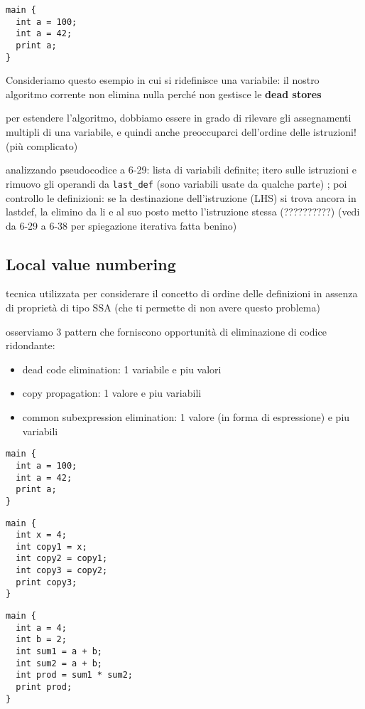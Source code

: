 \begin{lstlisting}
main {
  int a = 100;
  int a = 42;
  print a;
}\end{lstlisting}

Consideriamo questo esempio in cui si ridefinisce una variabile: il nostro algoritmo corrente non elimina nulla perch\'e non gestisce le \textbf{dead stores}

per estendere l'algoritmo, dobbiamo essere in grado di rilevare gli assegnamenti multipli di una variabile, e quindi anche preoccuparci dell'ordine delle istruzioni! (pi\`u complicato)

analizzando pseudocodice a 6-29: lista di variabili definite; itero sulle istruzioni e rimuovo gli operandi da \lstinline|last_def| (sono variabili usate da qualche parte) ; poi controllo le definizioni: se la destinazione dell'istruzione (LHS) si trova ancora in lastdef, la elimino da li e al suo posto metto l'istruzione stessa (??????????) (vedi da 6-29 a 6-38 per spiegazione iterativa fatta benino)

\subsection{Local value numbering}

tecnica utilizzata per considerare il concetto di ordine delle definizioni in assenza di propriet\`a di tipo SSA (che ti permette di non avere questo problema)

osserviamo 3 pattern che forniscono opportunit\`a di eliminazione di codice ridondante:
\begin{itemize}
  \item dead code elimination: 1 variabile e piu valori
  \item copy propagation: 1 valore e piu variabili
  \item common subexpression elimination: 1 valore (in forma di espressione) e piu variabili
\end{itemize}

\begin{lstlisting}
main {
  int a = 100;
  int a = 42;
  print a;
}\end{lstlisting}

\begin{lstlisting}
main {
  int x = 4;
  int copy1 = x;
  int copy2 = copy1;
  int copy3 = copy2;
  print copy3;
}\end{lstlisting}

\begin{lstlisting}
main {
  int a = 4;
  int b = 2;
  int sum1 = a + b;
  int sum2 = a + b;
  int prod = sum1 * sum2;
  print prod;
}\end{lstlisting}

